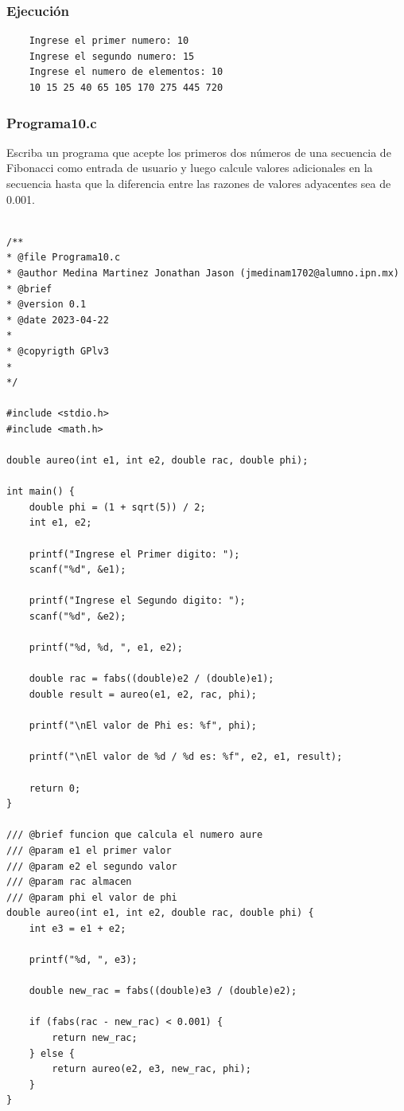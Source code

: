 \documentclass{article}
\begin{document}
	\subsubsection{Ejecución}
	
	\begin{lstlisting}
	Ingrese el primer numero: 10
	Ingrese el segundo numero: 15
	Ingrese el numero de elementos: 10
	10 15 25 40 65 105 170 275 445 720 
	\end{lstlisting}
	
	\subsubsection{Programa10.c}
	
	Escriba un programa que acepte los primeros dos números de una secuencia de Fibonacci como entrada de usuario y luego calcule valores adicionales en la secuencia hasta que la diferencia entre las razones de valores adyacentes sea de 0.001.
	
	\begin{lstlisting}
		
/**
* @file Programa10.c
* @author Medina Martinez Jonathan Jason (jmedinam1702@alumno.ipn.mx)
* @brief 
* @version 0.1
* @date 2023-04-22
* 
* @copyrigth GPlv3
* 
*/

#include <stdio.h>
#include <math.h>

double aureo(int e1, int e2, double rac, double phi);

int main() {
	double phi = (1 + sqrt(5)) / 2;
	int e1, e2;
	
	printf("Ingrese el Primer digito: ");
	scanf("%d", &e1);
	
	printf("Ingrese el Segundo digito: ");
	scanf("%d", &e2);
	
	printf("%d, %d, ", e1, e2);
	
	double rac = fabs((double)e2 / (double)e1);
	double result = aureo(e1, e2, rac, phi);
	
	printf("\nEl valor de Phi es: %f", phi);
	
	printf("\nEl valor de %d / %d es: %f", e2, e1, result);
	
	return 0;
}

/// @brief funcion que calcula el numero aure
/// @param e1 el primer valor
/// @param e2 el segundo valor
/// @param rac almacen
/// @param phi el valor de phi
double aureo(int e1, int e2, double rac, double phi) {
	int e3 = e1 + e2;
	
	printf("%d, ", e3);
	
	double new_rac = fabs((double)e3 / (double)e2);
	
	if (fabs(rac - new_rac) < 0.001) {
		return new_rac;
	} else {
		return aureo(e2, e3, new_rac, phi);
	}
}
	\end{lstlisting}
	
\end{document}
